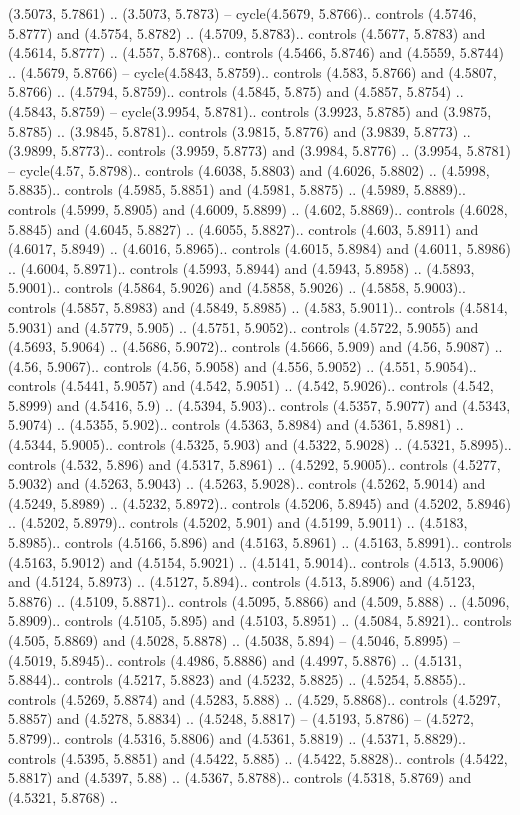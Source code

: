 (3.5073, 5.7861) .. (3.5073, 5.7873) -- cycle(4.5679, 5.8766).. controls (4.5746, 5.8777) and (4.5754, 5.8782) .. (4.5709, 5.8783).. controls (4.5677, 5.8783) and (4.5614, 5.8777) .. (4.557, 5.8768).. controls (4.5466, 5.8746) and (4.5559, 5.8744) .. (4.5679, 5.8766) -- cycle(4.5843, 5.8759).. controls (4.583, 5.8766) and (4.5807, 5.8766) .. (4.5794, 5.8759).. controls (4.5845, 5.875) and (4.5857, 5.8754) .. (4.5843, 5.8759) -- cycle(3.9954, 5.8781).. controls (3.9923, 5.8785) and (3.9875, 5.8785) .. (3.9845, 5.8781).. controls (3.9815, 5.8776) and (3.9839, 5.8773) .. (3.9899, 5.8773).. controls (3.9959, 5.8773) and (3.9984, 5.8776) .. (3.9954, 5.8781) -- cycle(4.57, 5.8798).. controls (4.6038, 5.8803) and (4.6026, 5.8802) .. (4.5998, 5.8835).. controls (4.5985, 5.8851) and (4.5981, 5.8875) .. (4.5989, 5.8889).. controls (4.5999, 5.8905) and (4.6009, 5.8899) .. (4.602, 5.8869).. controls (4.6028, 5.8845) and (4.6045, 5.8827) .. (4.6055, 5.8827).. controls (4.603, 5.8911) and (4.6017, 5.8949) .. (4.6016, 5.8965).. controls (4.6015, 5.8984) and (4.6011, 5.8986) .. (4.6004, 5.8971).. controls (4.5993, 5.8944) and (4.5943, 5.8958) .. (4.5893, 5.9001).. controls (4.5864, 5.9026) and (4.5858, 5.9026) .. (4.5858, 5.9003).. controls (4.5857, 5.8983) and (4.5849, 5.8985) .. (4.583, 5.9011).. controls (4.5814, 5.9031) and (4.5779, 5.905) .. (4.5751, 5.9052).. controls (4.5722, 5.9055) and (4.5693, 5.9064) .. (4.5686, 5.9072).. controls (4.5666, 5.909) and (4.56, 5.9087) .. (4.56, 5.9067).. controls (4.56, 5.9058) and (4.556, 5.9052) .. (4.551, 5.9054).. controls (4.5441, 5.9057) and (4.542, 5.9051) .. (4.542, 5.9026).. controls (4.542, 5.8999) and (4.5416, 5.9) .. (4.5394, 5.903).. controls (4.5357, 5.9077) and (4.5343, 5.9074) .. (4.5355, 5.902).. controls (4.5363, 5.8984) and (4.5361, 5.8981) .. (4.5344, 5.9005).. controls (4.5325, 5.903) and (4.5322, 5.9028) .. (4.5321, 5.8995).. controls (4.532, 5.896) and (4.5317, 5.8961) .. (4.5292, 5.9005).. controls (4.5277, 5.9032) and (4.5263, 5.9043) .. (4.5263, 5.9028).. controls (4.5262, 5.9014) and (4.5249, 5.8989) .. (4.5232, 5.8972).. controls (4.5206, 5.8945) and (4.5202, 5.8946) .. (4.5202, 5.8979).. controls (4.5202, 5.901) and (4.5199, 5.9011) .. (4.5183, 5.8985).. controls (4.5166, 5.896) and (4.5163, 5.8961) .. (4.5163, 5.8991).. controls (4.5163, 5.9012) and (4.5154, 5.9021) .. (4.5141, 5.9014).. controls (4.513, 5.9006) and (4.5124, 5.8973) .. (4.5127, 5.894).. controls (4.513, 5.8906) and (4.5123, 5.8876) .. (4.5109, 5.8871).. controls (4.5095, 5.8866) and (4.509, 5.888) .. (4.5096, 5.8909).. controls (4.5105, 5.895) and (4.5103, 5.8951) .. (4.5084, 5.8921).. controls (4.505, 5.8869) and (4.5028, 5.8878) .. (4.5038, 5.894) -- (4.5046, 5.8995) -- (4.5019, 5.8945).. controls (4.4986, 5.8886) and (4.4997, 5.8876) .. (4.5131, 5.8844).. controls (4.5217, 5.8823) and (4.5232, 5.8825) .. (4.5254, 5.8855).. controls (4.5269, 5.8874) and (4.5283, 5.888) .. (4.529, 5.8868).. controls (4.5297, 5.8857) and (4.5278, 5.8834) .. (4.5248, 5.8817) -- (4.5193, 5.8786) -- (4.5272, 5.8799).. controls (4.5316, 5.8806) and (4.5361, 5.8819) .. (4.5371, 5.8829).. controls (4.5395, 5.8851) and (4.5422, 5.885) .. (4.5422, 5.8828).. controls (4.5422, 5.8817) and (4.5397, 5.88) .. (4.5367, 5.8788).. controls (4.5318, 5.8769) and (4.5321, 5.8768) .. 